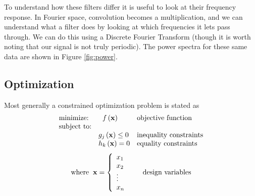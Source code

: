 \documentclass[12pt,a4paper,oneside]{book}
\begin{document}
To understand how these filters differ it is useful to look at their frequency response. In Fourier space, convolution becomes a multiplication, and we can understand what a filter does by looking at which frequencies it lets pass through. We can do this using a Discrete Fourier Transform (though it is worth noting that our signal is not truly periodic). The power spectra for these same data are shown in Figure \ref{fig:power}. 

\subsection{Optimization}
Most generally a constrained optimization problem is stated as 
\[
\begin{array}{lll}
\mbox{minimize:} & \hspace{2 mm} f\left(\mathbf{x}\right) & \mbox{objective function}\\
\mbox{subject to:} & & \\
& \centering g_j \left( \mathbf{x} \right) \leq 0 & \mbox{inequality constraints}\\
& \centering h_k \left(\mathbf{x} \right) = 0 & \mbox{equality constraints}
\end{array}
 \]
\[ 
\begin{array}{ll}
\mbox{where} \hspace{2 mm} \mathbf{x} = \left\{ \begin{array}{ll}
x_1 & \\
x_2 & \\
\vdots &\\
x_n &
\end{array} \right. & \mbox{design variables}
\end{array}
\]
\end{document}
